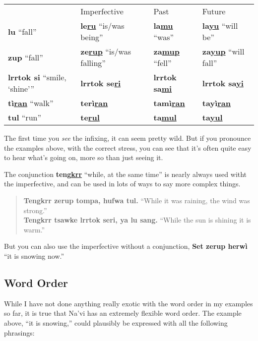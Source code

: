 \documentclass[nofonts]{tufte-handout}
\newcommand{\N}[1]{\textbf{\textcolor{navi}{#1}}}
\begin{document}
\medskip
\begin{tabular}{llll}
  & Imperfective & Past & Future \\
\N{lu} ``fall'' & \N{le\uline{ru}} ``is/was being'' & \N{la\uline{mu}}
    ``was'' & \N{la\uline{yu}} ``will be'' \\
\N{zup} ``fall'' & \N{ze\uline{rup}} ``is/was falling'' & \N{za\uline{mup}}
    ``fell'' & \N{za\uline{yup}} ``will fall''\\
\N{lrrtok si} ``smile, `shine''' & \N{lrrtok se\uline{ri}} &
    \N{lrrtok sa\uline{mi}} & \N{lrrtok sa\uline{yi}} \\
\N{tì\uline{ran}} ``walk'' & \N{terì\uline{ran}} & \N{tamì\uline{ran}} &
    \N{tayì\uline{ran}} \\
\N{tul} ``run'' & \N{te\uline{rul}} & \N{ta\uline{mul}}
     & \N{ta\uline{yul}} 
\end{tabular}
\medskip

\noindent The first time you \textit{see} the infixing,
it can seem pretty wild.  But if you pronounce the examples above,
with the correct stress, you can see that it's often quite easy to
hear what's going on, more so than just seeing it.

The conjunction \N{teng\uline{krr}} ``while, at the same time'' is
nearly always used witht the imperfective, and can be used in lots of
ways to say more complex things.

\begin{quotation}
\noindent\N{Tengkrr zerup tompa, hufwa tul.} ``While it was raining,
the wind was strong.''\\

\noindent\N{Tengkrr tsawke lrrtok seri, ya lu sang.} ``While the sun is
shining it is warm.''
\end{quotation}

\noindent But you can also use the imperfective without a conjunction,
\N{Set zerup herwì} ``it is snowing now.''

\subsection*{Word Order}
While I have not done anything really exotic with the word order in my
examples so far, it is true that Na'vi has an extremely flexible word
order.  The example above, ``it is snowing,'' could plausibly be
expressed with all the following phrasings:
\end{document}
